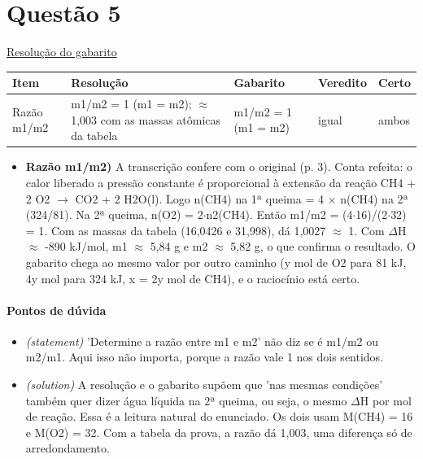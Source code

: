 \documentclass{article}%
\begin{document}
\section*{Questão 5}%
\href{https://poliedroresolve.sistemapoliedro.com.br/vestibulares/ime/2026/ime-2-fase-dia-3-25-10-2025-2-fase-dia-3/dissertativa-5-quimica-2-fase-dia-3-ime-2026}{Resolução do gabarito}\par\smallskip%
\begin{longtable}{@{}p{} p{} p{} p{} p{}@{}}\toprule Item & Resolução & Gabarito & Veredito & Certo \\ \midrule
Razão m1/m2 & m1/m2 = 1 (m1 = m2); $\approx$ 1,003 com as massas atômicas da tabela & m1/m2 = 1 (m1 = m2) & igual & ambos \\
\bottomrule\end{longtable}%
\begin{itemize}%
\item%
\textbf{Razão m1/m2)} A transcrição confere com o original (p. 3). Conta refeita: o calor liberado a pressão constante é proporcional à extensão da reação CH4 + 2 O2 $\to$ CO2 + 2 H2O(l). Logo n(CH4) na 1ª queima = 4 $\times$ n(CH4) na 2ª (324/81). Na 2ª queima, n(O2) = 2$\cdot$n2(CH4). Então m1/m2 = (4$\cdot$16)/(2$\cdot$32) = 1. Com as massas da tabela (16,0426 e 31,998), dá 1,0027 $\approx$ 1. Com $\Delta$H $\approx$ -890 kJ/mol, m1 $\approx$ 5,84 g e m2 $\approx$ 5,82 g, o que confirma o resultado. O gabarito chega ao mesmo valor por outro caminho (y mol de O2 para 81 kJ, 4y mol para 324 kJ, x = 2y mol de CH4), e o raciocínio está certo.%
\end{itemize}%
\paragraph{Pontos de dúvida}%
\begin{itemize}%
\item%
\textit{(statement)} 'Determine a razão entre m1 e m2' não diz se é m1/m2 ou m2/m1. Aqui isso não importa, porque a razão vale 1 nos dois sentidos.%
\item%
\textit{(solution)} A resolução e o gabarito supõem que 'nas mesmas condições' também quer dizer água líquida na 2ª queima, ou seja, o mesmo $\Delta$H por mol de reação. Essa é a leitura natural do enunciado. Os dois usam M(CH4) = 16 e M(O2) = 32. Com a tabela da prova, a razão dá 1,003, uma diferença só de arredondamento.%
\end{itemize}%
\end{document}
